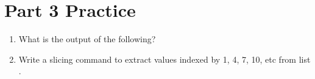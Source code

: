 \documentclass[letterpaper,10pt,english]{sphinxmanual}
\begin{document}
\section{Part 3 Practice}
\label{\detokenize{lecture_notes/lec10_lists2:part-3-practice}}\begin{enumerate}
\def\theenumi{\arabic{enumi}}
\def\labelenumi{\theenumi .}
\makeatletter\def\p@enumii{\p@enumi \theenumi .}\makeatother
\item {} 
What is the output of the following?

\begin{sphinxVerbatim}[commandchars=\\\{\}]
  \PYG{p}{[}     \PYG{p}{]}  \PYG{p}{[}\PYG{p}{]}  
  
\PYG{p}{[}\PYG{p}{]}  \PYG{p}{[}\PYG{p}{]}
\PYG{p}{[}\PYG{p}{]}  \PYG{p}{[}\PYG{p}{]}
\PYG{p}{[}\PYG{p}{]}  \PYG{p}{[}\PYG{p}{]}

\end{sphinxVerbatim}

\item {} 
Write a slicing command to extract values indexed
by 1, 4, 7, 10, etc from list .

\end{enumerate}
\end{document}

